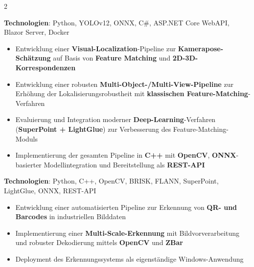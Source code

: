 \documentclass[10pt,a4paper,withhyper]{altacv}
\begin{document}
\begin{paracol}{2}
  \vspace{0.5em}

  \textbf{Technologien}: Python, YOLOv12, ONNX, C\#, ASP.NET Core WebAPI, Blazor Server, Docker

  \vspace{0.5em}


  \vspace{0.5em}

  \begin{itemize}
    \item Entwicklung einer \textbf{Visual-Localization}-Pipeline zur \textbf{Kamerapose-Schätzung} auf Basis von \textbf{Feature Matching} und \textbf{2D-3D-Korrespondenzen}
    \item Entwicklung einer robusten \textbf{Multi-Object-/Multi-View-Pipeline} zur Erhöhung der Lokalisierungsrobustheit mit \textbf{klassischen Feature-Matching}-Verfahren
    \item Evaluierung und Integration moderner \textbf{Deep-Learning}-Verfahren (\textbf{SuperPoint + LightGlue}) zur Verbesserung des Feature-Matching-Moduls
    \item Implementierung der gesamten Pipeline in \textbf{C++} mit \textbf{OpenCV}, \textbf{ONNX}-basierter Modellintegration und Bereitstellung als \textbf{REST-API}
  \end{itemize}

  \vspace{0.5em}

  \textbf{Technologien}: Python, C++, OpenCV, BRISK, FLANN, SuperPoint, LightGlue, ONNX, REST-API

  \vspace{0.5em}


  \vspace{0.5em}

  \begin{itemize}
    \item Entwicklung einer automatisierten Pipeline zur Erkennung von \textbf{QR- und Barcodes} in industriellen Bilddaten
    \item Implementierung einer \textbf{Multi-Scale-Erkennung} mit Bildvorverarbeitung und robuster Dekodierung mittels \textbf{OpenCV} und \textbf{ZBar}
    \item Deployment des Erkennungssystems als eigenständige Windows-Anwendung
  \end{itemize}


\end{paracol}
\end{document}
